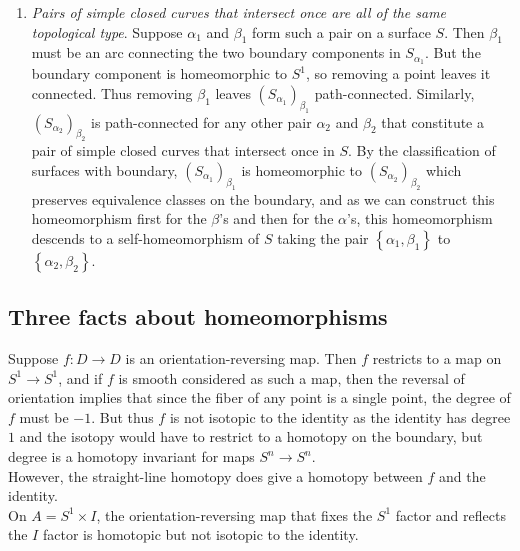 \documentclass[reqno]{amsart}
\theoremstyle{definition}
\theoremstyle{remark}
\begin{document}
\begin{enumerate}
    \item \textit{Pairs of simple closed curves that intersect
        once are all of the same topological type}.
        Suppose $\alpha_1$ and $\beta_1$ form
        such a pair on a surface $S$. Then
        $\beta_1$ must be an arc connecting the two
        boundary components in $S_{\alpha_1}$. But the boundary
        component is homeomorphic to $S^{1}$, so removing a 
        point leaves it connected. Thus removing
        $\beta_1$ leaves $\left( S_{\alpha_1} \right)_{\beta_1}$
        path-connected. Similarly,
        $\left( S_{\alpha_2} \right)_{\beta_2}$ is path-connected
        for any other pair $\alpha_2$ and $\beta_2$ that
        constitute a pair of simple closed curves
        that intersect once in $S$. By the classification
        of surfaces with boundary, $\left( S_{\alpha_1} \right)_{\beta_1}$ is
        homeomorphic to $\left( S_{\alpha_2} \right)_{\beta_2}$ 
        which preserves equivalence classes on the boundary,
        and as we can construct this homeomorphism first
        for the $\beta$'s and then for the $\alpha$'s, 
        this homeomorphism descends to a self-homeomorphism
        of $S$ taking the pair $\left\{ \alpha_1, \beta_1 \right\} $ 
        to $\left\{ \alpha_2, \beta_2 \right\} $.
\end{enumerate}


\subsection*{Three facts about homeomorphisms}

Suppose $f \colon D \to D$ is an orientation-reversing map.
Then $f$ restricts to a map on $S^{1} \to S^{1}$, and
if $f$ is smooth considered as such a map, then the
reversal of orientation implies that since the fiber
of any point is a single point, the degree of $f$ 
must be $-1$. But thus $f$ is not isotopic to the identity
as the identity has degree $1$ and the isotopy would
have to restrict to a homotopy on the boundary, but
degree is a homotopy invariant for maps $S^{n} \to S^{n}$.\\
However, the straight-line homotopy does give a homotopy
between $f$ and the identity.\\
\linebreak
On $A = S^{1} \times I$, the orientation-reversing map
that fixes the $S^{1}$ factor and reflects the $I$ factor
is homotopic but not isotopic to the identity.
\end{document}
